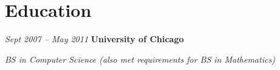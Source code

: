 \documentclass[10pt, letterpaper]{article}
\begin{document}
\section{Education}

\begin{twocolentry}{
    \textit{Sept 2007 – May 2011}
}
    \textbf{University of Chicago}
\end{twocolentry}

\begin{onecolentry}
    \textit{BS in Computer Science (also met requirements for BS in Mathematics)}
\end{onecolentry}

\begin{comment}

\vspace{0.1 cm}

\begin{onecolentry}
    \begin{highlights}
        \item ACM International Collegiate Programming Contest (ICPC), World Finalist (2010, 2011)
        \item USA Powerlifting, Collegiate National Finalist (2011)
    \end{highlights}
\end{onecolentry}
\end{comment}
\end{document}
